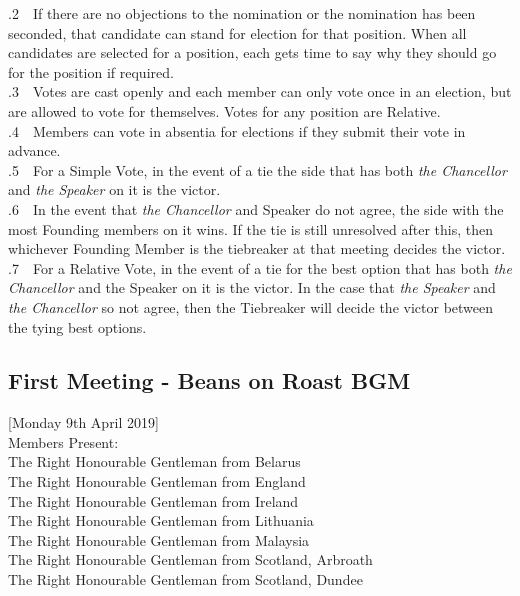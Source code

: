 \documentclass[a4paper,11pt]{article}
\begin{document}
.2$\quad$If there are no objections to the nomination or the nomination has been seconded, that candidate can stand for election for that position. When all candidates are selected for a position, each gets time to say why they should go for the position if required.\\

.3$\quad$Votes are cast openly and each member can only vote once in an election, but are allowed to vote for themselves. Votes for any position are Relative.\\  

.4$\quad$Members can vote in absentia for elections if they submit their vote in advance.\\

.5$\quad$For a Simple Vote, in the event of a tie the side that has both \textit{the Chancellor} and \textit{the Speaker} on it is the victor. \\

.6$\quad$In the event that \textit{the Chancellor} and Speaker do not agree, the side with the most Founding members on it wins. If the tie is still unresolved after this, then whichever Founding Member is the tiebreaker at that meeting decides the victor.\\

.7$\quad$For a Relative Vote, in the event of a tie for the best option that has both \textit{the Chancellor} and the Speaker on it is the victor. In the case that \textit{the Speaker} and \textit{the Chancellor} so not agree, then the Tiebreaker will decide the victor between the tying best options.

\subsection{First Meeting - Beans on Roast BGM}
\label{First Meeting - Beans on Roast BGM}
[Monday 9th April 2019]\\
Members Present:\\
The Right Honourable Gentleman from Belarus\\
The Right Honourable Gentleman from England\\
The Right Honourable Gentleman from Ireland\\
The Right Honourable Gentleman from Lithuania\\
The Right Honourable Gentleman from Malaysia\\
The Right Honourable Gentleman from Scotland, Arbroath\\
The Right Honourable Gentleman from Scotland, Dundee\\
\end{document}
